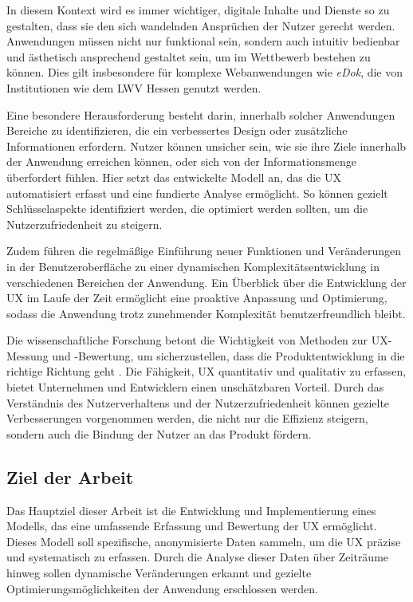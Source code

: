 \documentclass[12pt,oneside]{article}
\begin{document}
In diesem Kontext wird es immer wichtiger, digitale Inhalte und Dienste so zu gestalten, dass sie den sich wandelnden Ansprüchen der Nutzer gerecht werden. Anwendungen müssen nicht nur funktional sein, sondern auch intuitiv bedienbar und ästhetisch ansprechend gestaltet sein, um im Wettbewerb bestehen zu können. Dies gilt insbesondere für komplexe Webanwendungen wie \textit{eDok}, die von Institutionen wie dem LWV Hessen genutzt werden.

Eine besondere Herausforderung besteht darin, innerhalb solcher Anwendungen Bereiche zu identifizieren, die ein verbessertes Design oder zusätzliche Informationen erfordern. Nutzer können unsicher sein, wie sie ihre Ziele innerhalb der Anwendung erreichen können, oder sich von der Informationsmenge überfordert fühlen. Hier setzt das entwickelte Modell an, das die UX automatisiert erfasst und eine fundierte Analyse ermöglicht. So können gezielt Schlüsselaspekte identifiziert werden, die optimiert werden sollten, um die Nutzerzufriedenheit zu steigern.

Zudem führen die regelmäßige Einführung neuer Funktionen und Veränderungen in der Benutzeroberfläche zu einer dynamischen Komplexitätsentwicklung in verschiedenen Bereichen der Anwendung. Ein Überblick über die Entwicklung der UX im Laufe der Zeit ermöglicht eine proaktive Anpassung und Optimierung, sodass die Anwendung trotz zunehmender Komplexität benutzerfreundlich bleibt.

Die wissenschaftliche Forschung betont die Wichtigkeit von Methoden zur UX-Messung und -Bewertung, um sicherzustellen, dass die Produktentwicklung in die richtige Richtung geht \cite{Virpi}. Die Fähigkeit, UX quantitativ und qualitativ zu erfassen, bietet Unternehmen und Entwicklern einen unschätzbaren Vorteil. Durch das Verständnis des Nutzerverhaltens und der Nutzerzufriedenheit können gezielte Verbesserungen vorgenommen werden, die nicht nur die Effizienz steigern, sondern auch die Bindung der Nutzer an das Produkt fördern.

\subsection{Ziel der Arbeit}

Das Hauptziel dieser Arbeit ist die Entwicklung und Implementierung eines Modells, das eine umfassende Erfassung und Bewertung der UX ermöglicht. Dieses Modell soll spezifische, anonymisierte Daten sammeln, um die UX präzise und systematisch zu erfassen. Durch die Analyse dieser Daten über Zeiträume hinweg sollen dynamische Veränderungen erkannt und gezielte Optimierungsmöglichkeiten der Anwendung erschlossen werden.
\end{document}
